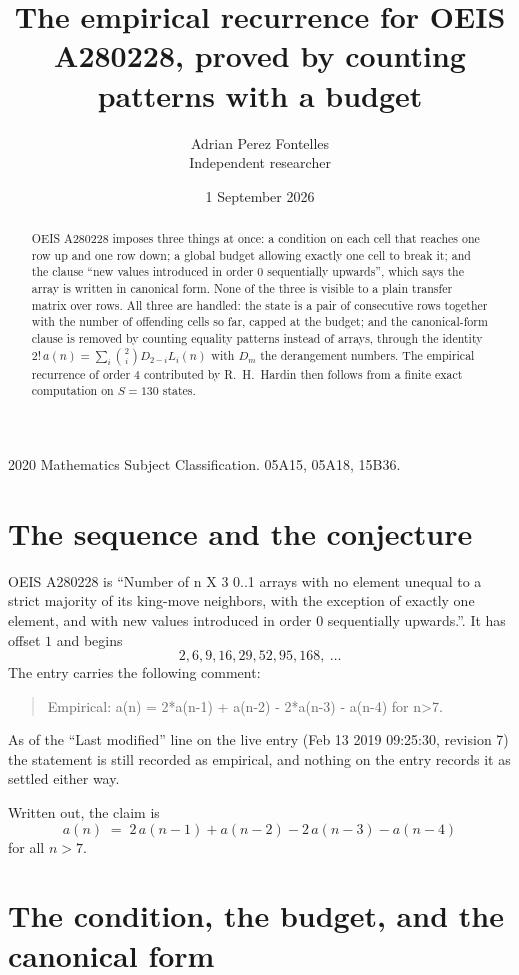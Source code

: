 \documentclass[11pt,a4paper]{article}
\title{The empirical recurrence for OEIS A280228, proved by counting patterns with a budget}
\author{Adrian Perez Fontelles\\ \small Independent researcher}
\date{1 September 2026}
\theoremstyle{plain}
\theoremstyle{definition}
\begin{document}
\maketitle

\begin{abstract}
OEIS A280228 imposes three things at once: a condition on each cell that reaches one row up and
one row down; a global budget allowing exactly one cell to
break it; and the clause ``new values introduced in order $0$ sequentially upwards'', which
says the array is written in canonical form. None of the three is visible to a plain transfer
matrix over rows. All three are handled: the state is a pair of consecutive rows
together with the number of offending cells so far, capped at the budget; and the
canonical-form clause is removed by counting equality patterns instead of arrays, through the
identity $2!\,a(n)=\sum_i\binom{2}{i}D_{2-i}L_i(n)$ with $D_m$ the derangement
numbers. The empirical recurrence of order $4$ contributed by R.~H.~Hardin then follows
from a finite exact computation on $S=130$ states.
\end{abstract}

\noindent\small 2020 Mathematics Subject Classification. 05A15, 05A18, 15B36.\normalsize

\section{The sequence and the conjecture}

OEIS A280228 is ``Number of n X 3 0..1 arrays with no element unequal to a strict majority of its king-move neighbors, with the exception of exactly one element, and with new values introduced in order 0 sequentially upwards.''. It has offset $1$ and begins
\[
2, 6, 9, 16, 29, 52, 95, 168,\ \dots
\]
The entry carries the following comment:
\begin{quote}\small
Empirical: a(n) = 2*a(n-1) + a(n-2) - 2*a(n-3) - a(n-4) for n>7.
\end{quote}
As of the ``Last modified'' line on the live entry (Feb 13 2019 09:25:30, revision 7) the statement is
still recorded as empirical, and nothing on the entry records it as settled either way.

Written out, the claim is
\begin{equation}\label{eq:conj}
a(n)\;=\;2\,a(n-1) + a(n-2) - 2\,a(n-3) - a(n-4)
\end{equation}
for all $n>7$.

\section{The condition, the budget, and the canonical form}
\end{document}
